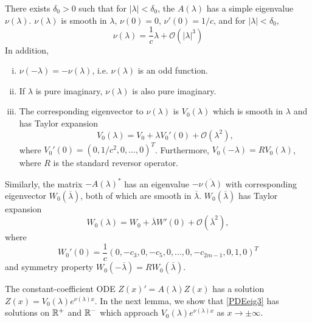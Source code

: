 \documentclass[thesis.tex]{subfiles}
\begin{document}

\begin{lemma}\label{nulambdalemma}
There exists $\delta_0 > 0$ such that for $|\lambda| < \delta_0$, the $A(\lambda)$ has a simple eigenvalue $\nu(\lambda)$. $\nu(\lambda)$ is smooth in $\lambda$, $\nu(0) = 0$, $\nu'(0) = 1/c$, and for $|\lambda| < \delta_0$,
\begin{equation}\label{nulambda}
\nu(\lambda) = \frac{1}{c} \lambda + \mathcal{O}(|\lambda|^3)
\end{equation}
In addition,
\begin{enumerate}[(i)]
\item $\nu(-\lambda) = -\nu(\lambda)$, i.e. $\nu(\lambda)$ is an odd function.
\item If $\lambda$ is pure imaginary, $\nu(\lambda)$ is also pure imaginary.
\item The corresponding eigenvector to $\nu(\lambda)$ is $V_0(\lambda)$ which is smooth in $\lambda$ and has Taylor expansion
\begin{equation}\label{V0expansion}
V_0(\lambda) = V_0 + \lambda V_0'(0) + \mathcal{O}(\lambda^2),
\end{equation}
where $V_0'(0) = (0, 1/c^2, 0, \dots, 0)^T$. Furthermore, $V_0(-\lambda) = R V_0(\lambda)$, where $R$ is the standard reversor operator.
\end{enumerate}

Similarly, the matrix $-A(\lambda)^*$ has an eigenvalue $-\overline{\nu(\lambda)}$ with corresponding eigenvector $W_0(\overline{\lambda})$, both of which are smooth in $\overline{\lambda}$. $W_0(\overline{\lambda})$ has Taylor expansion
\begin{equation}\label{W0expansion}
W_0(\lambda) = W_0 + \overline{\lambda} W'(0) + \mathcal{O}(\overline{\lambda}^2),
\end{equation}
where 
\begin{equation}\label{W0prime}
W_0'(0) = \frac{1}{c} \left( 0, -c_3, 0, -c_5, 0, \dots, 0, -c_{2m-1}, 0, 1, 0\right)^T
\end{equation}
and symmetry property $W_0(-\overline{\lambda}) = R W_0(\overline{\lambda})$.
\end{lemma}

The constant-coefficient ODE $Z(x)' = A(\lambda)Z(x)$ has a solution $Z(x) = V_0(\lambda)e^{\nu(\lambda)x}$. In the next lemma, we show that \cref{PDEeig3} has solutions on $\mathbb{R}^+$ and $\mathbb{R}^-$ which approach $V_0(\lambda)e^{\nu(\lambda)x}$ as $x \rightarrow \pm \infty$.
\end{document}
